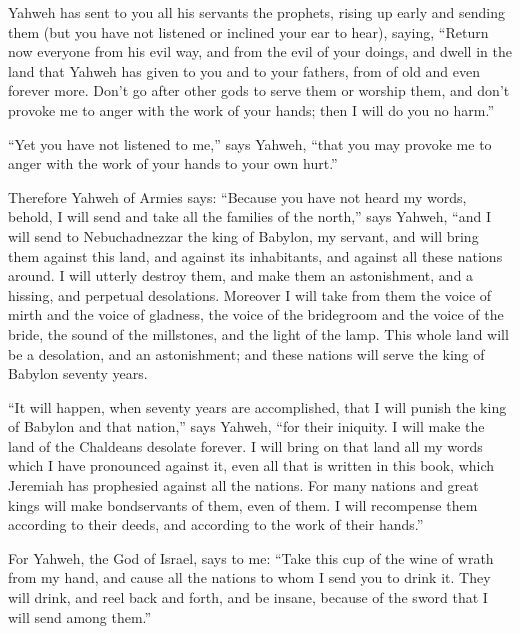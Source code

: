  Yahweh has sent to you all his servants the prophets,
rising up early and sending them (but you have not listened or inclined
your ear to hear),  saying, ``Return now everyone from his
evil way, and from the evil of your doings, and dwell in the land that
Yahweh has given to you and to your fathers, from of old and even
forever more.  Don't go after other gods to serve them or
worship them, and don't provoke me to anger with the work of your hands;
then I will do you no harm.''

 ``Yet you have not listened to me,'' says Yahweh, ``that
you may provoke me to anger with the work of your hands to your own
hurt.''

 Therefore Yahweh of Armies says: ``Because you have not
heard my words,  behold, I will send and take all the
families of the north,'' says Yahweh, ``and I will send to
Nebuchadnezzar the king of Babylon, my servant, and will bring them
against this land, and against its inhabitants, and against all these
nations around. I will utterly destroy them, and make them an
astonishment, and a hissing, and perpetual desolations. 
Moreover I will take from them the voice of mirth and the voice of
gladness, the voice of the bridegroom and the voice of the bride, the
sound of the millstones, and the light of the lamp.  This
whole land will be a desolation, and an astonishment; and these nations
will serve the king of Babylon seventy years.

 ``It will happen, when seventy years are accomplished,
that I will punish the king of Babylon and that nation,'' says Yahweh,
``for their iniquity. I will make the land of the Chaldeans desolate
forever.  I will bring on that land all my words which I
have pronounced against it, even all that is written in this book, which
Jeremiah has prophesied against all the nations.  For many
nations and great kings will make bondservants of them, even of them. I
will recompense them according to their deeds, and according to the work
of their hands.''

 For Yahweh, the God of Israel, says to me: ``Take this cup
of the wine of wrath from my hand, and cause all the nations to whom I
send you to drink it.  They will drink, and reel back and
forth, and be insane, because of the sword that I will send among
them.''

